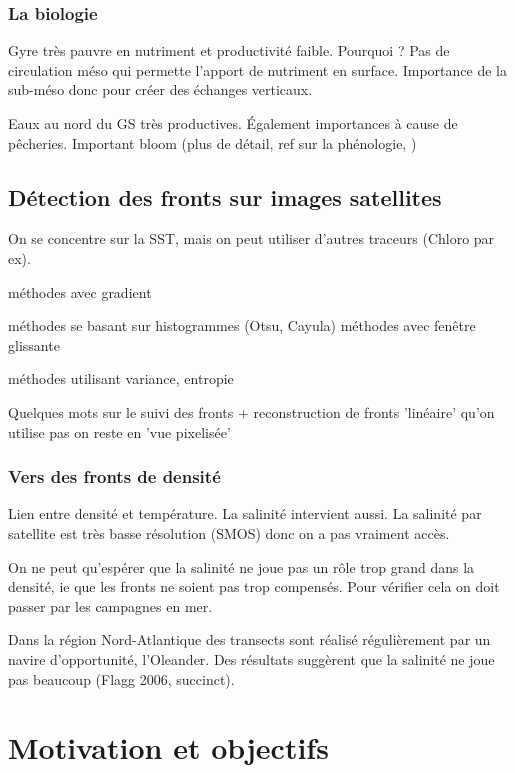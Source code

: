 \subsubsection{La biologie}
\label{sec:gs-biologie}

Gyre très pauvre en nutriment et productivité faible.
Pourquoi ?
Pas de circulation méso qui permette l'apport de nutriment en surface.
Importance de la sub-méso donc pour créer des échanges verticaux.

Eaux au nord du GS très productives.
Également importances à cause de pêcheries.
Important bloom (plus de détail, ref sur la phénologie, )


\subsection{Détection des fronts sur images satellites}
\label{sec:detection-fronts}

On se concentre sur la SST, mais on peut utiliser d'autres traceurs (Chloro par ex).

méthodes avec gradient

méthodes se basant sur histogrammes (Otsu, Cayula)
méthodes avec fenêtre glissante

méthodes utilisant variance, entropie

Quelques mots sur le suivi des fronts + reconstruction de fronts 'linéaire'
qu'on utilise pas on reste en 'vue pixelisée'

\subsubsection{Vers des fronts de densité}


Lien entre densité et température.
La salinité intervient aussi. La salinité par satellite est très basse résolution (SMOS) donc on a pas vraiment accès.

On ne peut qu'espérer que la salinité ne joue pas un rôle trop grand dans la densité, ie que les fronts ne soient pas trop compensés.
Pour vérifier cela on doit passer par les campagnes en mer.

Dans la région Nord-Atlantique des transects sont réalisé régulièrement par un navire d'opportunité, l'Oleander.
Des résultats suggèrent que la salinité ne joue pas beaucoup (Flagg 2006, succinct).

\section{Motivation et objectifs}
\label{sec:problematique}

